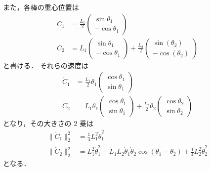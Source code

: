 また，各棒の重心位置は
\begin{align}
    C_1 & = \frac{L_1}{2} \begin{pmatrix}
                              \sin\theta_1 \\
                              -\cos\theta_1
                          \end{pmatrix}
    \\
    C_2 & = L_1 \begin{pmatrix}
                    \sin\theta_1 \\
                    -\cos\theta_1
                \end{pmatrix}
    + \frac{L_2}{2} \begin{pmatrix}
                        \sin(\theta_2) \\
                        -\cos(\theta_2)
                    \end{pmatrix}
\end{align}
と書ける．
それらの速度は
\begin{align}
    \dot{C}_1 & = \frac{L_1}{2} \dot{\theta}_1 \begin{pmatrix}
                                                   \cos\theta_1 \\
                                                   \sin\theta_1
                                               \end{pmatrix}
    \\
    \dot{C}_2 & = L_1 \dot{\theta}_1 \begin{pmatrix}
                                         \cos\theta_1 \\
                                         \sin\theta_1
                                     \end{pmatrix}
    + \frac{L_2}{2} \dot{\theta}_2 \begin{pmatrix}
                                       \cos\theta_2 \\
                                       \sin\theta_2
                                   \end{pmatrix}
\end{align}
となり，その大きさの 2 乗は
\begin{align}
    \|\dot{C}_1\|_2^2
     & = \frac{1}{4} L_1^2 \dot{\theta}_1^2
    \\
    \|\dot{C}_2\|_2^2
     & = L_1^2 \dot{\theta}_1^2
    + L_1 L_2 \dot{\theta}_1 \dot{\theta}_2 \cos(\theta_1 - \theta_2)
    + \frac{1}{4} L_2^2 \dot{\theta}_2^2
\end{align}
となる．

